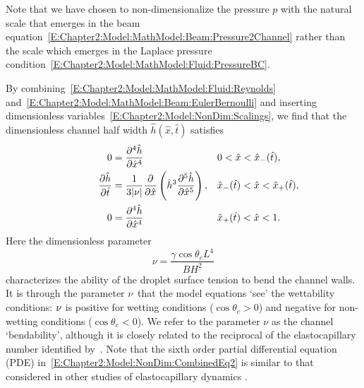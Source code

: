 Note that we have chosen to non-dimensionalize the pressure $p$ with the natural scale that emerges in the beam equation~\eqref{E:Chapter2:Model:MathModel:Beam:Pressure2Channel} rather than the scale which emerges in the Laplace pressure condition~\eqref{E:Chapter2:Model:MathModel:Fluid:PressureBC}.

By combining~\eqref{E:Chapter2:Model:MathModel:Fluid:Reynolds} and~\eqref{E:Chapter2:Model:MathModel:Beam:EulerBernoulli} and inserting dimensionless variables~\eqref{E:Chapter2:Model:NonDim:Scalings}, we find that the dimensionless channel half width $\hat{h}(\hat{x}, \hat{t})$ satisfies
\begin{align}
0 &= \frac{\partial ^4\hat{h}}{\partial \hat{x}^4} & &0 < \hat{x} < \hat{x}_{-}(\hat{t}),\label{E:Chapter2:Model:NonDim:CombinedEq1} \\
\frac{\partial \hat{h}}{\partial \hat{t}} &=  \frac{1}{3|\nu|}\frac{\partial }{\partial \hat{x}}\left(\hat{h}^3 \frac{\partial ^5 \hat{h}}{\partial \hat{x}^5}\right) ,  & &\hat{x}_{-}(\hat{t}) < \hat{x} <  \hat{x}_{+}(\hat{t}),\label{E:Chapter2:Model:NonDim:CombinedEq2}\\
\qquad \qquad0 &= \frac{\partial ^4\hat{h}}{\partial \hat{x}^4} &  &  \hat{x}_{+}(\hat{t}) < \hat{x} < 1.\label{E:Chapter2:Model:NonDim:CombinedEq3}
\end{align}
Here the dimensionless parameter
\begin{equation}\label{E:Chapter2:Model:NonDim:nuDefn}
\nu = \frac{\gamma \cos \theta_e L^4}{B H^2}
\end{equation}
characterizes the ability of the droplet surface tension to bend the channel walls. It is through the parameter $\nu$ that the model equations `see' the wettability conditions: $\nu$ is positive for wetting conditions ($\cos \theta_e > 0$) and negative for non-wetting conditions ($\cos \theta_e < 0$). We refer to the parameter $\nu$ as the channel `bendability', although it is closely related to the reciprocal of the elastocapillary number identified by~\cite{Mastrangelo1993JMEMS}. Note that the sixth order partial differential equation (PDE) in~\eqref{E:Chapter2:Model:NonDim:CombinedEq2} is similar to that considered in other studies of elastocapillary dynamics \cite[see][for example]{Flitton2004EJApplMech, Duprat2011JFM, Aristoff2011IntJNonlinMech, Taroni2012JFM}.

